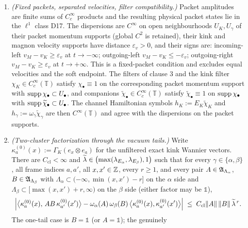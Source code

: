 \begin{definition}
\begin{enumerate}
merely nonzero overlap with the band, is part of the exactness hypothesis. A
position-delta normalisation, the case $\chi_\gamma\equiv1$, is not assumed and
is in fact incompatible with a compactly supported energy--momentum filter.
\item \emph{(Fixed packets, separated velocities, filter compatibility.)}
Packet amplitudes are finite sums of $C_c^\infty$ products and the resulting
physical packet states lie in the $\ell^1$ class D17. The dispersions are
$C^\infty$ on open neighbourhoods $U_K,U_\gamma$ of their packet momentum
supports (global $C^2$ is retained), their kink and magnon velocity supports
have distance $\varepsilon_v>0$, and their signs are: incoming-left
$v_M-v_K\ge\varepsilon_v$ at $t\to-\infty$; outgoing-left
$v_M-v_K\le-\varepsilon_v$; outgoing-right $v_M-v_K\ge\varepsilon_v$ at
$t\to+\infty$. This is a fixed-packet condition and excludes equal velocities
and the soft endpoint. The filters of clause 3 and the kink filter
$\chi_K\in C_c^\infty(\mathbb{T})$ satisfy $\chi_\bullet\equiv1$ on the
corresponding packet momentum support with
$\operatorname{supp}\chi_\bullet\subset U_\bullet$, and companions
$\widetilde{\chi}_\bullet\in C_c^\infty(\mathbb{T})$ satisfy
$\widetilde{\chi}_\bullet\equiv1$ on $\operatorname{supp}\chi_\bullet$ with
$\operatorname{supp}\widetilde{\chi}_\bullet\subset U_\bullet$. The channel Hamiltonian
symbols $h_K:=E_K\widetilde{\chi}_K$ and
$h_\gamma:=\omega_\gamma\widetilde{\chi}_\gamma$ are then
$C^\infty(\mathbb{T})$ and agree with the dispersions on the packet supports.
\item \emph{(Two-cluster factorization through the vacuum tails.)} Write
$\kappa_a^{(0)}(x):=\Gamma_K(e_x\otimes e_a)$ for the unfiltered exact kink
Wannier vectors. There are $C_{\mathrm{cl}}<\infty$ and
$\widetilde{\lambda}\in\bigl(\max(\lambda_{E_\alpha},\lambda_{E_\beta}),1\bigr)$ such that
for every $\gamma\in\{\alpha,\beta\}$, all frame indices $a,a'$, all
$x,x'\in\mathbb{Z}$, every $r\ge1$, and every pair $A\in\mathfrak{A}_{\Lambda_\alpha}$,
$B\in\mathfrak{A}_{\Lambda_\beta}$ with
$\Lambda_\alpha\subset(-\infty,\min(x,x')-r]$ on the $\alpha$ side and
$\Lambda_\beta\subset[\max(x,x')+r,\infty)$ on the $\beta$ side (either factor
may be $\mathbb{1}$),
\begin{equation}
  \Bigl|\bigl\langle\kappa_a^{(0)}(x),\,AB\,\kappa_{a'}^{(0)}(x')\bigr\rangle
  -\omega_\alpha(A)\,\omega_\beta(B)\,
   \bigl\langle\kappa_a^{(0)}(x),\kappa_{a'}^{(0)}(x')\bigr\rangle\Bigr|
  \;\le\;C_{\mathrm{cl}}\lVert A\rVert\,\lVert B\rVert\,\widetilde{\lambda}^{\,r}.
  \label{eq:d28-c}
\end{equation}
The one-tail case is $B=\mathbb{1}$ (or $A=\mathbb{1}$); the genuinely

\end{enumerate}
\end{definition}
